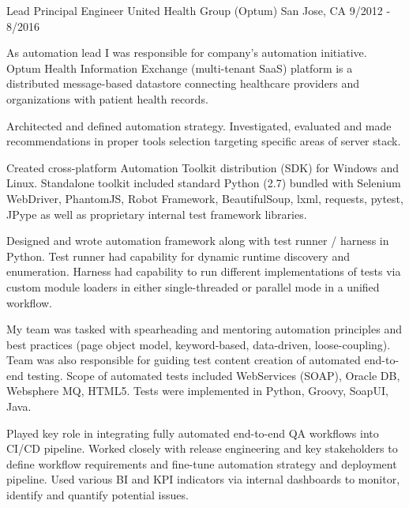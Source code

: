 \documentclass[11pt, a4paper]{awesome-cv}
\begin{document}
\begin{cventries}

  \cventry
    {Lead Principal Engineer} %
    {United Health Group (Optum)} %
    {San Jose, CA} %
    {9/2012 - 8/2016} %
    {
      \begin{cvitems} %
        \item {As automation lead I was responsible for company’s automation initiative. Optum Health Information Exchange (multi-tenant SaaS) platform is a distributed message-based datastore connecting healthcare providers and organizations with patient health records.}
        \item {Architected and defined automation strategy. Investigated, evaluated and made recommendations in proper tools selection targeting specific areas of server stack.}
        \item {Created cross-platform Automation Toolkit distribution (SDK) for Windows and Linux. Standalone toolkit included standard Python (2.7) bundled with Selenium WebDriver, PhantomJS, Robot Framework, BeautifulSoup, lxml, requests, pytest, JPype as well as proprietary internal test framework libraries.}
        \item {Designed and wrote automation framework along with test runner / harness in Python. Test runner had capability for dynamic runtime discovery and enumeration. Harness had capability to run different implementations of tests via custom module loaders in either single-threaded or parallel mode in a unified workflow.}
        \item {My team was tasked with spearheading and mentoring automation principles and best practices (page object model, keyword-based, data-driven, loose-coupling). Team was also responsible for guiding test content creation of automated end-to-end testing. Scope of automated tests included WebServices (SOAP), Oracle DB, Websphere MQ, HTML5. Tests were implemented in Python, Groovy, SoapUI, Java.}
        \item {Played key role in integrating fully automated end-to-end QA workflows into CI/CD pipeline. Worked closely with release engineering and key stakeholders to define workflow requirements and fine-tune automation strategy and deployment pipeline. Used various BI and KPI indicators via internal dashboards to monitor, identify and quantify potential issues.}

\end{cvitems}}
\end{cventries}
\end{document}
